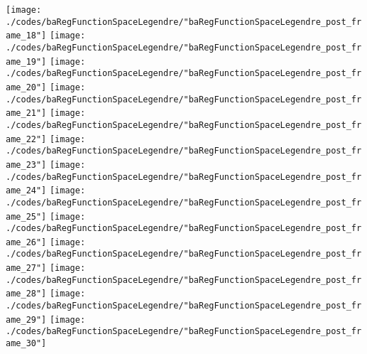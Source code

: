 \begin{frame}{\insertsection}
\begin{center}
{\begin{animateinline}{15}
				 \texttt{[image: ./codes/baRegFunctionSpaceLegendre/"baRegFunctionSpaceLegendre\_post\_frame\_18"]}\newframe
				 \texttt{[image: ./codes/baRegFunctionSpaceLegendre/"baRegFunctionSpaceLegendre\_post\_frame\_19"]}\newframe
				 \texttt{[image: ./codes/baRegFunctionSpaceLegendre/"baRegFunctionSpaceLegendre\_post\_frame\_20"]}\newframe
				 \texttt{[image: ./codes/baRegFunctionSpaceLegendre/"baRegFunctionSpaceLegendre\_post\_frame\_21"]}\newframe
				 \texttt{[image: ./codes/baRegFunctionSpaceLegendre/"baRegFunctionSpaceLegendre\_post\_frame\_22"]}\newframe
				 \texttt{[image: ./codes/baRegFunctionSpaceLegendre/"baRegFunctionSpaceLegendre\_post\_frame\_23"]}\newframe
				 \texttt{[image: ./codes/baRegFunctionSpaceLegendre/"baRegFunctionSpaceLegendre\_post\_frame\_24"]}\newframe
				 \texttt{[image: ./codes/baRegFunctionSpaceLegendre/"baRegFunctionSpaceLegendre\_post\_frame\_25"]}\newframe
				 \texttt{[image: ./codes/baRegFunctionSpaceLegendre/"baRegFunctionSpaceLegendre\_post\_frame\_26"]}\newframe
				 \texttt{[image: ./codes/baRegFunctionSpaceLegendre/"baRegFunctionSpaceLegendre\_post\_frame\_27"]}\newframe
				 \texttt{[image: ./codes/baRegFunctionSpaceLegendre/"baRegFunctionSpaceLegendre\_post\_frame\_28"]}\newframe
				 \texttt{[image: ./codes/baRegFunctionSpaceLegendre/"baRegFunctionSpaceLegendre\_post\_frame\_29"]}\newframe
				 \texttt{[image: ./codes/baRegFunctionSpaceLegendre/"baRegFunctionSpaceLegendre\_post\_frame\_30"]}
			 \end{animateinline}
			}
	\end{center}
    
\end{frame}


